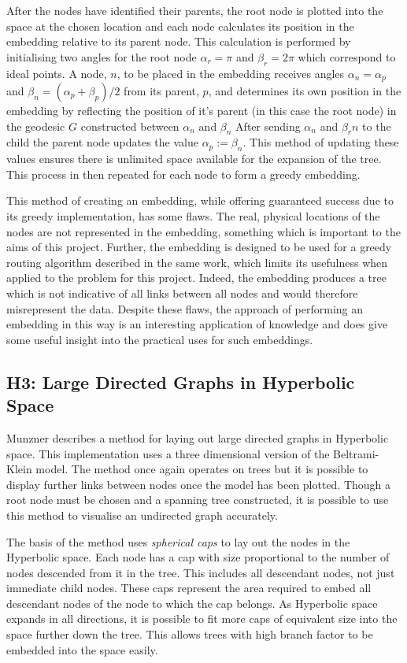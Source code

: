 After the nodes have identified their parents, the root node is plotted into the space at the chosen location and each node calculates its position in the embedding relative to its parent node. This calculation is performed by initialising two angles for the root node $\alpha_r = \pi$ and $\beta_r = 2\pi$ which correspond to ideal points. A node, $n$, to be placed in the embedding receives angles $\alpha_n = \alpha_p$ and $\beta_n = (\alpha_p + \beta_p) /2$ from its parent, $p$, and determines its own position in the embedding by reflecting the position of it's parent (in this case the root node) in the geodesic $G$ constructed between $\alpha_n$ and $\beta_n$ After sending $\alpha_n$ and $\beta_rn$ to the child the parent node updates the value $\alpha_p := \beta_n$. This method of updating these values ensures there is unlimited space available for the expansion of the tree. This process in then repeated for each node to form a greedy embedding. 

This method of creating an embedding, while offering guaranteed success due to its greedy implementation, has some flaws. The real, physical locations of the nodes are not represented in the embedding, something which is important to the aims of this project. Further, the embedding is designed to be used for a greedy routing algorithm described in the same work, which limits its usefulness when applied to the problem for this project. Indeed, the embedding produces a tree which is not indicative of all links between all nodes and would therefore misrepresent the data. Despite these flaws, the approach of performing an embedding in this way is an interesting application of knowledge and does give some useful insight into the practical uses for such embeddings. 

\subsection{H3: Large Directed Graphs in Hyperbolic Space}

Munzner \cite{munzner_h3_1997} describes a method for laying out large directed graphs in Hyperbolic space. This implementation uses a three dimensional version of the Beltrami-Klein model. The method once again operates on trees but it is possible to display further links between nodes once the model has been plotted. Though a root node must be chosen and a spanning tree constructed, it is possible to use this method to visualise an undirected graph accurately. 

The basis of the method uses \textit{spherical caps} to lay out the nodes in the Hyperbolic space. Each node has a cap with size proportional to the number of nodes descended from it in the tree. This includes all descendant nodes, not just immediate child nodes. These caps represent the area required to embed all descendant nodes of the node to which the cap belongs. As Hyperbolic space expands in all directions, it is possible to fit more caps of equivalent size into the space further down the tree. This allows trees with high branch factor to be embedded into the space easily.

